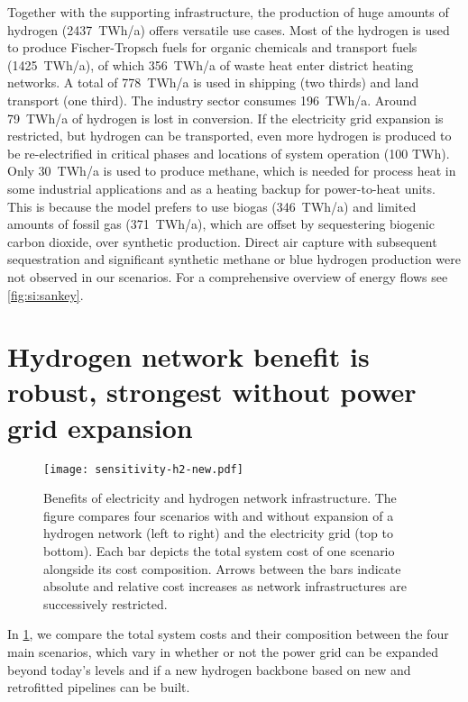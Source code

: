 

Together with the supporting infrastructure, the production of huge amounts of
hydrogen (2437~TWh/a) offers versatile use cases. Most of the hydrogen is used
to produce Fischer-Tropsch fuels for organic chemicals and transport fuels
(1425~TWh/a), of which 356~TWh/a of waste heat enter district heating networks.
A total of 778~TWh/a is used in shipping (two thirds) and land transport (one
third). The industry sector consumes 196~TWh/a. Around 79~TWh/a of hydrogen is
lost in conversion. If the electricity grid expansion is restricted, but
hydrogen can be transported, even more hydrogen is produced to be re-electrified
in critical phases and locations of system operation (100 TWh\el). Only 30~TWh/a
is used to produce methane, which is needed for process heat in some industrial
applications and as a heating backup for power-to-heat units. This is because
the model prefers to use biogas (346~TWh/a) and limited amounts of fossil gas
(371~TWh/a), which are offset by sequestering biogenic carbon dioxide, over
synthetic production. Direct air capture with subsequent sequestration and
significant synthetic methane or blue hydrogen production were not observed in
our scenarios. For a comprehensive overview of energy flows see
\cref{fig:si:sankey}.

\section*{Hydrogen network benefit is robust, strongest without power grid expansion}
\label{sec:h2}

\begin{figure}
    \centering
    \texttt{[image: sensitivity-h2-new.pdf]}
    \caption{Benefits of electricity and hydrogen network infrastructure. The
    figure compares four scenarios with and without expansion of a hydrogen
    network (left to right) and the electricity grid (top to bottom). Each bar
    depicts the total system cost of one scenario alongside its cost
    composition. Arrows between the bars indicate absolute and relative cost
    increases as network infrastructures are successively restricted.}
    \label{fig:sensitivity-h2}
\end{figure}

In \cref{fig:sensitivity-h2}, we compare the total system costs and their
composition between the four main scenarios, which vary in whether or not the
power grid can be expanded beyond today's levels and if a new hydrogen backbone
based on new and retrofitted pipelines can be built.


